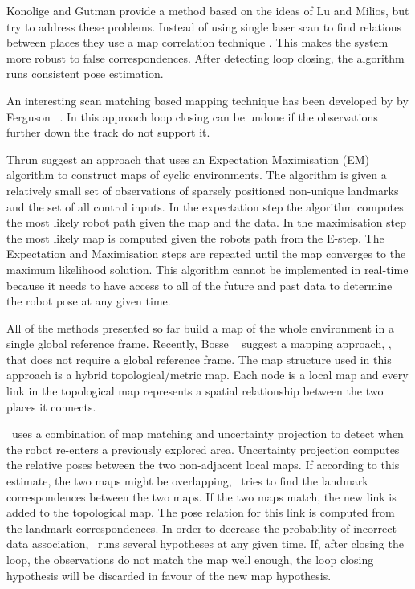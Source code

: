 Konolige and Gutman
\cite{konolige99:_increm_mappin_large_cyclic_envir} provide a method
based on the ideas of Lu and Milios, but try to address these
problems. Instead of using single laser scan to find relations between
places they use a map correlation technique \cite{konolige99}. This
makes the system more robust to false correspondences. After detecting
loop closing, the algorithm runs consistent pose estimation. 

An interesting scan matching based mapping technique has been
developed by by Ferguson \etal\ \cite{fergusson2003}. In this
approach loop closing can be undone if the observations further down
the track do not support it.

Thrun \etal \cite{slam_thrun98b,Thrun98a,thrun98:_probab} suggest an
approach that uses an Expectation Maximisation (EM) algorithm to
construct maps of cyclic environments. The algorithm is given a
relatively small set of observations of sparsely positioned non-unique
landmarks and the set of all control inputs. In the expectation step the
algorithm computes the most likely robot path given the map and the
data. In the maximisation step the most likely map is computed given
the robots path from the E-step. The Expectation and Maximisation
steps are repeated until the map converges to the maximum likelihood
solution. This algorithm cannot be implemented in real-time because
it needs to have access to all of the future and past data to
determine the robot pose at any given time. %

All of the methods presented so far build a map of the whole
environment in a single global reference frame. Recently, Bosse \etal\
\cite{bosse03atlas} suggest a mapping approach, \Atlas, that does not
require a global reference frame. The map structure used in this
approach is a hybrid topological/metric map.  Each node is a local map
and every link in the topological map represents a spatial
relationship between the two places it connects. 

\Atlas\ uses a combination of map matching and uncertainty projection
to detect when the robot re-enters a previously explored area.
Uncertainty projection computes the relative poses between the two
non-adjacent local maps. If according to this estimate, the two maps
might be overlapping, \Atlas\ tries to find the landmark
correspondences between the two maps. If the two maps match, the new
link is added to the topological map. The pose relation for this link
is computed from the landmark correspondences. In order to decrease
the probability of incorrect data association, \Atlas\ runs several
hypotheses at any given time. If, after closing the loop, the
observations do not match the map well enough, the loop closing
hypothesis will be discarded in favour of the new map hypothesis.


